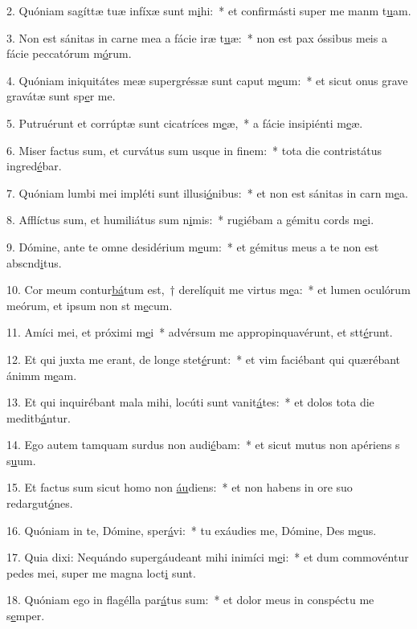 2. Quóniam sagíttæ tuæ infíxæ sunt m\uline{i}hi:~* et confirmásti super me manm t\uline{u}am.\par 
3. Non est sánitas in carne mea a fácie iræ t\uline{u}æ:~* non est pax óssibus meis a fácie peccatórum m\uline{ó}rum.\par 
4. Quóniam iniquitátes meæ supergréssæ sunt caput m\uline{e}um:~* et sicut onus grave gravátæ sunt sp\uline{e}r me.\par 
5. Putruérunt et corrúptæ sunt cicatríces m\uline{e}æ,~* a fácie insipiénti m\uline{e}æ.\par 
6. Miser factus sum, et curvátus sum usque in f\uline{i}nem:~* tota die contristátus ingred\uline{é}bar.\par 
7. Quóniam lumbi mei impléti sunt illusi\uline{ó}nibus:~* et non est sánitas in carn m\uline{e}a.\par 
8. Afflíctus sum, et humiliátus sum n\uline{i}mis:~* rugiébam a gémitu cords m\uline{e}i.\par 
9. Dómine, ante te omne desidérium m\uline{e}um:~* et gémitus meus a te non est abscnd\uline{i}tus.\par 
10. Cor meum contur\uline{bá}tum est,~† derelíquit me virtus m\uline{e}a:~* et lumen oculórum meórum, et ipsum non st m\uline{e}cum.\par 
11. Amíci mei, et próximi m\uline{e}i~* advérsum me appropinquavérunt, et stt\uline{é}runt.\par 
12. Et qui juxta me erant, de longe stet\uline{é}runt:~* et vim faciébant qui quærébant ánimm m\uline{e}am.\par 
13. Et qui inquirébant mala mihi, locúti sunt vanit\uline{á}tes:~* et dolos tota die meditb\uline{á}ntur.\par 
14. Ego autem tamquam surdus non audi\uline{é}bam:~* et sicut mutus non apériens s s\uline{u}um.\par 
15. Et factus sum sicut homo non \uline{áu}diens:~* et non habens in ore suo redargut\uline{ó}nes.\par 
16. Quóniam in te, Dómine, sper\uline{á}vi:~* tu exáudies me, Dómine, Des m\uline{e}us.\par 
17. Quia dixi: Nequándo supergáudeant mihi inimíci m\uline{e}i:~* et dum commovéntur pedes mei, super me magna loct\uline{i} sunt.\par 
18. Quóniam ego in flagélla par\uline{á}tus sum:~* et dolor meus in conspéctu me s\uline{e}mper.\par 
